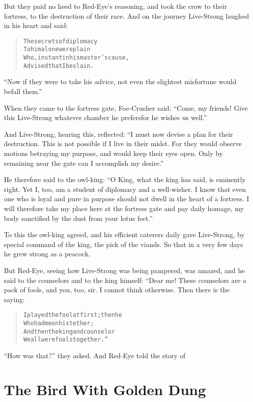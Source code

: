 \documentclass[article, twoside, 14pt]{memoir}
\renewenvironment{verbatim}{%
\begin{quote}%
\vskip -10pt%
\begin{alltt}\normalfont\large}{\end{alltt}%
\end{quote}%
\vskip -10pt
} %
\begin{document}
But they paid no heed to Red-Eye's reasoning, and took the crow to
their fortress, to the destruction of their race. And on the
journey Live-Strong laughed in his heart and said:

\begin{verbatim}
The secrets of diplomacy
    To him alone were plain
Who, instant in his master's cause,
    Advised that I be slain.
\end{verbatim}
``Now if they were to take his advice, not even the slightest misfortune would befall them.''

When they came to the fortress gate, Foe-Crusher said:
``Come, my friends! Give this Live-Strong whatever chamber he prefers{\textemdash}for he wishes us well.''

And Live-Strong, hearing this, reflected:
``I must now devise a plan for their destruction. This is not possible if I live in their midst. For they would observe motions betraying my purpose, and would keep their eyes open. Only by remaining near the gate can I accomplish my desire.''

He therefore said to the owl-king:
``O King, what the king has said, is eminently right. Yet I, too, am a student of diplomacy and a well-wisher. I know that even one who is loyal and pure in purpose should not dwell in the heart of a fortress. I will therefore take my place here at the fortress gate and pay daily homage, my body sanctified by the dust from your lotus feet.''

To this the owl-king agreed, and his efficient caterers daily gave
Live-Strong, by special command of the king, the pick of the
viands. So that in a very few days he grew strong as a peacock.

But Red-Eye, seeing how Live-Strong was being pampered, was amazed,
and he said to the counselors and to the king himself: “Dear me!
These counselors are a pack of fools, and you, too, sir. I cannot
think otherwise. Then there is the saying:

\begin{verbatim}
I played the fool at first; then he
    Who had me on his tether;
And then the king and counselor{\textemdash}
    We all were fools together.”
\end{verbatim}
``How was that?'' they asked. And Red-Eye told the story of

\chapter{The Bird With Golden Dung}
\end{document}
